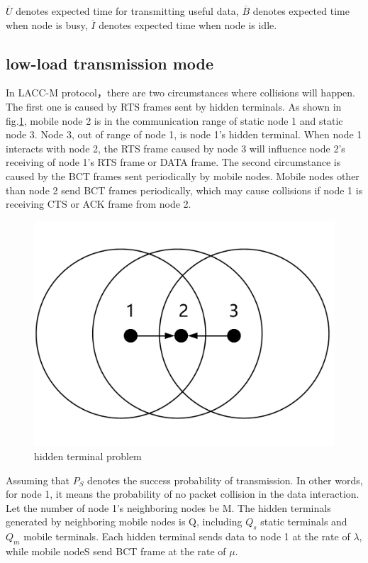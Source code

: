 \documentclass[conference]{IEEEtran}
\begin{document}
$\overline U$ denotes expected time for transmitting useful data, $\overline B$ denotes expected time when node is busy, $\overline I$ denotes expected time when node is idle. 

\subsection {low-load transmission mode}
In LACC-M protocol，there are two circumstances where collisions will happen. The first one is caused by RTS frames sent by hidden terminals. As shown in fig.\ref{fig:example}, mobile node 2 is in the communication range of static node 1 and static node 3. Node 3, out of range of node 1, is node 1's hidden terminal. When node 1 interacts with node 2, the RTS frame caused by node 3 will influence node 2's receiving of node 1's RTS frame or DATA frame. The second circumstance is caused by the BCT frames sent periodically by mobile nodes. Mobile nodes other than node 2 send BCT frames periodically, which may cause collisions if node 1 is receiving CTS or ACK frame from node 2.
\begin{figure}[!ht]
	\centering
	\includegraphics[scale=0.1]{figures/6.pdf}
	\caption{
		hidden terminal problem
	}
	\label{fig:example}
\end{figure}

Assuming that $P_S$ denotes the success probability of transmission. In other words, for node 1, it means the probability of no packet collision in the data interaction. Let the number of node 1's neighboring nodes be M. The hidden terminals generated by neighboring mobile nodes is Q, including $Q_s$ static terminals and $Q_m$ mobile terminals. Each hidden terminal sends data to node 1 at the rate of $\lambda$, while mobile nodeS send BCT frame at the rate of $\mu$. 
\end{document}
